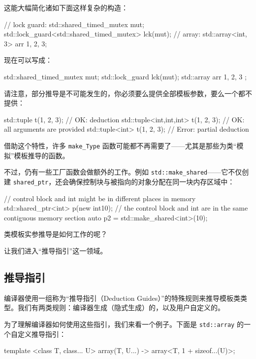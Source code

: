 这能大幅简化诸如下面这样复杂的构造：

\begin{codebox}[cpp]
// lock guard:
std::shared_timed_mutex mut;
std::lock_guard<std::shared_timed_mutex> lck(mut);
// array:
std::array<int, 3> arr {1, 2, 3};
\end{codebox}

现在可以写成：

\begin{codebox}[cpp]
std::shared_timed_mutex mut;
std::lock_guard lck(mut);
std::array arr { 1, 2, 3 };
\end{codebox}

请注意，部分推导是不可能发生的，你必须要么提供全部模板参数，要么一个都不提供：

\begin{codebox}[cpp]
std::tuple t(1, 2, 3);
// OK: deduction
std::tuple<int,int,int> t(1, 2, 3); // OK: all arguments are provided
std::tuple<int> t(1, 2, 3);
// Error: partial deduction
\end{codebox}

借助这个特性，许多 \texttt{make\_Type} 函数可能都不再需要了——尤其是那些为类“模拟”模板推导的函数。

不过，仍有一些工厂函数会做额外的工作。例如 \texttt{std::make\_shared}——它不仅创建 \texttt{shared\_ptr}，还会确保控制块与被指向的对象分配在同一块内存区域中：

\begin{codebox}[cpp]
// control block and int might be in different places in memory
std::shared_ptr<int> p(new int{10});
// the control block and int are in the same contiguous memory section
auto p2 = std::make_shared<int>(10);
\end{codebox}

类模板实参推导是如何工作的呢？

让我们进入“推导指引”这一领域。

\subsection{推导指引}

编译器使用一组称为“推导指引（Deduction Guides）”的特殊规则来推导模板类类型。我们有两类规则：编译器生成（隐式生成）的，以及用户自定义的。

为了理解编译器如何使用这些指引，我们来看一个例子。下面是 \texttt{std::array} 的一个自定义推导指引：

\begin{codebox}[cpp]
template <class T, class... U>
array(T, U...) -> array<T, 1 + sizeof...(U)>;
\end{codebox}


